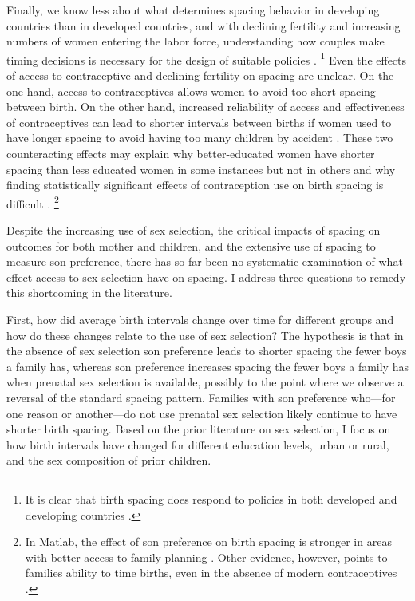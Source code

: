 \documentclass[12pt,letterpaper]{article}
\begin{document}
Finally, we know less about what determines spacing behavior in developing countries than 
in developed countries, and with declining fertility and increasing numbers of women 
entering the labor force, understanding how couples make timing decisions is necessary 
for the design of suitable policies \citep{Portner2018}.%
\footnote{
It is clear that birth spacing does respond to policies in both developed and 
developing countries \citep{Pettersson-Lidbom2009,Todd2012,Meckel2015,Ghosh2018}.
}
Even the effects of access to contraceptive and declining fertility on spacing are unclear.
On the one hand, access to contraceptives allows women to avoid too short spacing between 
birth.
On the other hand, increased reliability of access and effectiveness of contraceptives can 
lead to shorter intervals between births if women used to have longer spacing to avoid
having too many children by accident \citep{Keyfitz1971,Heckman1976}.
These two counteracting effects may explain why better-educated women have shorter spacing 
than less educated women in some instances but not in others and why finding statistically 
significant effects of contraception use on birth spacing is difficult 
\citep{Tulasidhar1993,Whitworth2002,Bhalotra2008,Yeakey2009,Kim2010,Soest2018}.%
\footnote{
In Matlab, the effect of son preference on birth spacing is stronger in areas with better 
access to family planning \citep{Rahman1993}.
Other evidence, however, points to families ability to time births, even in the absence
of modern contraceptives \citep{Jayachandran2011,Alam2018}.
}

Despite the increasing use of sex selection, the critical impacts of spacing on outcomes 
for both mother and children, and the extensive use of spacing to measure son preference, 
there has so far been no systematic examination of what effect access to sex selection 
have on spacing.
I address three questions to remedy this shortcoming in the literature.

First, how did average birth intervals change over time for different groups and how do 
these changes relate to the use of sex selection?
The hypothesis is that in the absence of sex selection son preference leads to shorter 
spacing the fewer boys a family has, whereas son preference increases spacing the fewer 
boys a family has when prenatal sex selection is available, possibly to the point where
we observe a reversal of the standard spacing pattern.
Families with son preference who---for one reason or another---do not use prenatal sex 
selection likely continue to have shorter birth spacing.
Based on the prior literature on sex selection, I focus on how birth intervals have
changed for different education levels, urban or rural, and the sex composition of 
prior children.
\end{document}
